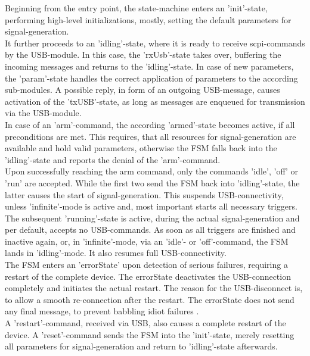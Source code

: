 	Beginning from the entry point, the state-machine enters an 'init'-state, performing high-level initializations, mostly, setting the default parameters for signal-generation. \\
	
	It further proceeds to an 'idling'-state, where it is ready to receive scpi-commands by the USB-module. In this case, the 'rxUsb'-state takes over, buffering the incoming messages and returns to the 'idling'-state. In case of new parameters, the 'param'-state handles the correct application of parameters to the according sub-modules. A possible reply, in form of an outgoing USB-message, causes activation of the 'txUSB'-state, as long as messages are enqueued for transmission via the USB-module. \\
	
	In case of an 'arm'-command, the according 'armed'-state becomes active, if all preconditions are met. This requires, that all resources for signal-generation are available and hold valid parameters, otherwise the FSM falls back into the 'idling'-state and reports the denial of the 'arm'-command. \\
	
	Upon successfully reaching the arm command, only the commands 'idle', 'off' or 'run' are accepted. While the first two send the FSM back into 'idling'-state, the latter causes the start of signal-generation. This suspends USB-connectivity, unless 'infinite'-mode is active and, most important starts all necessary triggers. The subsequent 'running'-state is active, during the actual signal-generation and per default, accepts no USB-commands. As soon as all triggers are finished and inactive again, or, in 'infinite'-mode, via an 'idle'- or 'off'-command, the FSM lands in 'idling'-mode. It also resumes full USB-connectivity. \\
	
	The FSM enters an 'errorState' upon detection of serious failures, requiring a restart of the complete device. The errorState deactivates the USB-connection completely and initiates the actual restart. The reason for the USB-disconnect is, to allow a smooth re-connection after the restart. The errorState does not send any final message, to prevent babbling idiot failures \cite{Wang2009AvoidingTB}. \\
	
	A 'restart'-command, received via USB, also causes a complete restart of the device. A 'reset'-command sends the FSM into the 'init'-state, merely resetting all parameters for signal-generation and return to 'idling'-state afterwards. \\
	
